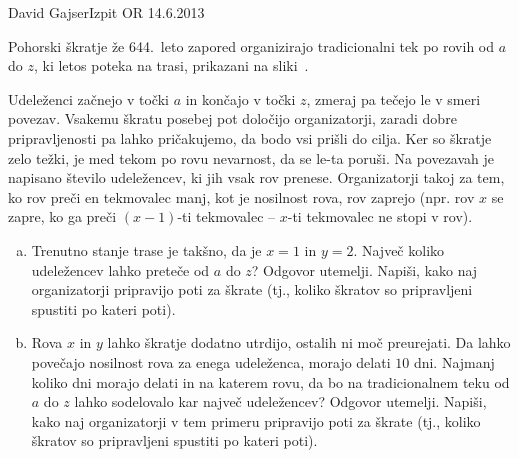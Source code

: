 \begin{naloga}{David Gajser}{Izpit OR 14.6.2013}
\begin{vprasanje}
Pohorski škratje že 644.~leto zapored
organizirajo tradicionalni tek po rovih od $a$ do $z$,
ki letos poteka na trasi, prikazani na sliki~\fig.

Udeleženci začnejo v točki $a$ in končajo v točki $z$,
zmeraj pa tečejo le v smeri povezav.
Vsakemu škratu posebej pot določijo organizatorji,
zaradi dobre pripravljenosti pa lahko pričakujemo,
da bodo vsi prišli do cilja.
Ker so škratje zelo težki,
je med tekom po rovu nevarnost, da se le-ta poruši.
Na povezavah je napisano število udeležencev, ki jih vsak rov prenese.
Organizatorji takoj za tem, ko rov preči en tekmovalec manj,
kot je nosilnost rova, rov zaprejo
(npr. rov $x$ se zapre, ko ga preči $(x-1)$-ti tekmovalec
-- $x$-ti tekmovalec ne stopi v rov).

\begin{enumerate}[(a)]
\item Trenutno stanje trase je takšno, da je $x = 1$ in $y = 2$.
Največ koliko udeležencev lahko preteče od $a$ do $z$?
Odgovor utemelji.
Napiši, kako naj organizatorji pripravijo poti za škrate
(tj., koliko škratov so pripravljeni spustiti po kateri poti).

\item Rova $x$ in $y$ lahko škratje dodatno utrdijo,
ostalih ni moč preurejati.
Da lahko povečajo nosilnost rova za enega udeleženca, morajo delati $10$ dni.
Najmanj koliko dni morajo delati in na katerem rovu,
da bo na tradicionalnem teku od $a$ do $z$
lahko sodelovalo kar največ udeležencev?
Odgovor utemelji.
Napiši, kako naj organizatorji v tem primeru pripravijo poti za škrate
(tj., koliko škratov so pripravljeni spustiti po kateri poti).
\end{enumerate}

\begin{slika}
\pgfslika
{}
\end{slika}
\end{vprasanje}
\begin{odgovor}
\end{odgovor}
\end{naloga}

